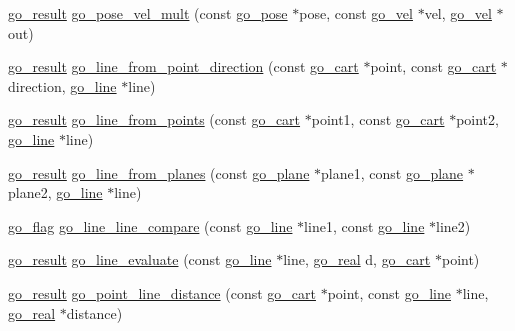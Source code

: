\begin{DoxyCompactItemize}
\item 
\hyperlink{gotypes_8h_a55d48b38cd959f63c7e8db8337a9792a}{go\-\_\-result} \hyperlink{namespacegomotion_a02133a76965d9e2111eca88ef5961f81}{go\-\_\-pose\-\_\-vel\-\_\-mult} (const \hyperlink{structgomotion_1_1go__pose}{go\-\_\-pose} $\ast$pose, const \hyperlink{structgomotion_1_1go__vel}{go\-\_\-vel} $\ast$vel, \hyperlink{structgomotion_1_1go__vel}{go\-\_\-vel} $\ast$out)
\item 
\hyperlink{gotypes_8h_a55d48b38cd959f63c7e8db8337a9792a}{go\-\_\-result} \hyperlink{namespacegomotion_aac937b55b391d0b7565719d301389bc6}{go\-\_\-line\-\_\-from\-\_\-point\-\_\-direction} (const \hyperlink{structgomotion_1_1go__cart}{go\-\_\-cart} $\ast$point, const \hyperlink{structgomotion_1_1go__cart}{go\-\_\-cart} $\ast$direction, \hyperlink{structgomotion_1_1go__line}{go\-\_\-line} $\ast$line)
\item 
\hyperlink{gotypes_8h_a55d48b38cd959f63c7e8db8337a9792a}{go\-\_\-result} \hyperlink{namespacegomotion_a13ea203461728105546fe4af4083f6ba}{go\-\_\-line\-\_\-from\-\_\-points} (const \hyperlink{structgomotion_1_1go__cart}{go\-\_\-cart} $\ast$point1, const \hyperlink{structgomotion_1_1go__cart}{go\-\_\-cart} $\ast$point2, \hyperlink{structgomotion_1_1go__line}{go\-\_\-line} $\ast$line)
\item 
\hyperlink{gotypes_8h_a55d48b38cd959f63c7e8db8337a9792a}{go\-\_\-result} \hyperlink{namespacegomotion_a239960b865134d678928490b91100702}{go\-\_\-line\-\_\-from\-\_\-planes} (const \hyperlink{structgomotion_1_1go__plane}{go\-\_\-plane} $\ast$plane1, const \hyperlink{structgomotion_1_1go__plane}{go\-\_\-plane} $\ast$plane2, \hyperlink{structgomotion_1_1go__line}{go\-\_\-line} $\ast$line)
\item 
\hyperlink{gotypes_8h_ae890d9a0ddecc0d3073622cc4312092d}{go\-\_\-flag} \hyperlink{namespacegomotion_a5b409973e65746e7698f0afbcf9183de}{go\-\_\-line\-\_\-line\-\_\-compare} (const \hyperlink{structgomotion_1_1go__line}{go\-\_\-line} $\ast$line1, const \hyperlink{structgomotion_1_1go__line}{go\-\_\-line} $\ast$line2)
\item 
\hyperlink{gotypes_8h_a55d48b38cd959f63c7e8db8337a9792a}{go\-\_\-result} \hyperlink{namespacegomotion_a301c198b3225ff73ad5598c046166a4a}{go\-\_\-line\-\_\-evaluate} (const \hyperlink{structgomotion_1_1go__line}{go\-\_\-line} $\ast$line, \hyperlink{gotypes_8h_afd666a2393eebd71ee455846ac9def9b}{go\-\_\-real} d, \hyperlink{structgomotion_1_1go__cart}{go\-\_\-cart} $\ast$point)
\item 
\hyperlink{gotypes_8h_a55d48b38cd959f63c7e8db8337a9792a}{go\-\_\-result} \hyperlink{namespacegomotion_a2144eb2d183b1aaf60549d66ae7dfcf6}{go\-\_\-point\-\_\-line\-\_\-distance} (const \hyperlink{structgomotion_1_1go__cart}{go\-\_\-cart} $\ast$point, const \hyperlink{structgomotion_1_1go__line}{go\-\_\-line} $\ast$line, \hyperlink{gotypes_8h_afd666a2393eebd71ee455846ac9def9b}{go\-\_\-real} $\ast$distance)

\end{DoxyCompactItemize}
